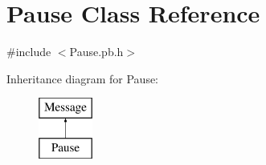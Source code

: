 \hypertarget{class_pause}{\section{Pause Class Reference}
\label{class_pause}
}


{\ttfamily \#include $<$Pause.\-pb.\-h$>$}

Inheritance diagram for Pause\-:\begin{figure}[H]
\begin{center}
\leavevmode
\includegraphics[height=2.000000cm]{class_pause}
\end{center}
\end{figure}
